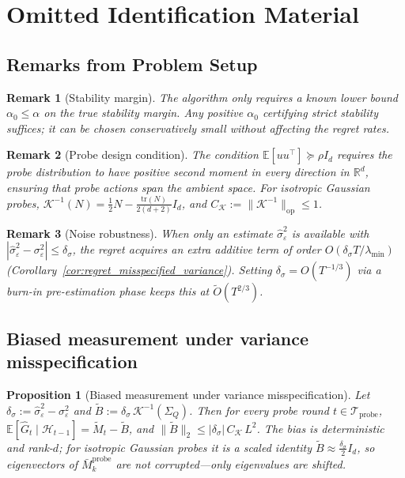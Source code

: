 \documentclass{article}
\newcommand{\R}{\mathbb{R}}
\newcommand{\E}{\mathbb{E}}
\newcommand{\op}{\mathrm{op}}
\newcommand{\cH}{\mathcal{H}}
\newcommand{\cTprobe}{\mathcal{T}_{\mathrm{probe}}}
\newcommand{\tr}{\mathrm{tr}}
\newtheorem{proposition}{Proposition}
\newtheorem{remark}{Remark}
\begin{document}
\normalsize

\section{Omitted Identification Material}
\label{app:omitted_identification}

\subsection{Remarks from Problem Setup}

\begin{remark}[Stability margin]
\label{rem:stability_margin}
The algorithm only requires a known lower bound $\alpha_0 \le \alpha$ on the true stability margin.
Any positive $\alpha_0$ certifying strict stability suffices; it can be chosen conservatively small without affecting the regret rates.
\end{remark}

\begin{remark}[Probe design condition]
\label{rem:probe_design}
The condition $\E[uu^\top] \succeq \rho I_d$ requires the probe distribution to have positive second moment in every direction in $\R^d$, ensuring that probe actions span the ambient space.
For isotropic Gaussian probes, $\mathcal{K}^{-1}(N) = \frac{1}{2}N - \frac{\tr(N)}{2(d+2)} I_d$, and $C_{\mathcal K} := \|\mathcal{K}^{-1}\|_{\op} \le 1$.
\end{remark}

\begin{remark}[Noise robustness]
\label{rem:noise_robustness}
When only an estimate $\hat\sigma_\varepsilon^2$ is available with $|\hat\sigma_\varepsilon^2 - \sigma_\varepsilon^2| \le \delta_\sigma$, the regret acquires an extra additive term of order $O(\delta_\sigma T/\lambda_{\min})$ (Corollary~\ref{cor:regret_misspecified_variance}).
Setting $\delta_\sigma = O(T^{-1/3})$ via a burn-in pre-estimation phase keeps this at $\widetilde O(T^{2/3})$.
\end{remark}

\subsection{Biased measurement under variance misspecification}

\begin{proposition}[Biased measurement under variance misspecification]
\label{prop:biased_measurement}
Let $\delta_\sigma := \hat\sigma_\varepsilon^2 - \sigma_\varepsilon^2$ and $\widetilde B := \delta_\sigma\,\mathcal K^{-1}(\Sigma_Q)$.
Then for every probe round $t\in\cTprobe$,
$\E[\hat G_t \mid \cH_{t-1}] = \widetilde M_t - \widetilde B$,
and $\|\widetilde B\|_2 \le |\delta_\sigma|\,C_{\mathcal K}\,L^2$.
The bias is deterministic and rank-$d$; for isotropic Gaussian probes it is a scaled identity $\widetilde B \approx \frac{\delta_\sigma}{2}I_d$, so eigenvectors of $\bar M_k^{\mathrm{probe}}$ are not corrupted---only eigenvalues are shifted.
\end{proposition}
\end{document}
